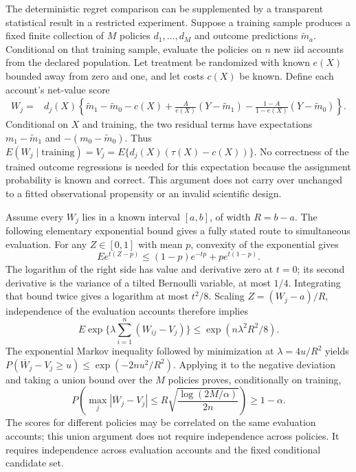 The deterministic regret comparison can be supplemented by a transparent
statistical result in a restricted experiment. Suppose a training sample
produces a fixed finite collection of $M$ policies $d_1,\ldots,d_M$ and
outcome predictions $\widetilde m_a$. Conditional on that training sample,
evaluate the policies on $n$ new iid accounts from the declared population.
Let treatment be randomized with known $e(X)$ bounded away from zero and
one, and let costs $c(X)$ be known. Define each account's net-value score
\begin{align}
 W_j={}&d_j(X)\left\{\widetilde m_1-\widetilde m_0-c(X)
       +\frac{A}{e(X)}(Y-\widetilde m_1)
       -\frac{1-A}{1-e(X)}(Y-\widetilde m_0)\right\}.
 \label{exec17:s4-policy-score}
\end{align}
Conditional on $X$ and training, the two residual terms have expectations
$m_1-\widetilde m_1$ and $-(m_0-\widetilde m_0)$. Thus
$E(W_j\mid\text{training})=V_j=E\{d_j(X)(\tau(X)-c(X))\}$.
No correctness of the trained outcome regressions is needed for this
expectation because the assignment probability is known and correct.
This argument does not carry over unchanged to a fitted observational
propensity or an invalid scientific design.

Assume every $W_j$ lies in a known interval $[a,b]$, of width $R=b-a$.
The following elementary exponential bound gives a fully stated route to
simultaneous evaluation. For any $Z\in[0,1]$ with mean $p$, convexity of
the exponential gives
\[
 E e^{t(Z-p)}\leq (1-p)e^{-tp}+p e^{t(1-p)}.
\]
The logarithm of the right side has value and derivative zero at $t=0$;
its second derivative is the variance of a tilted Bernoulli variable,
at most $1/4$. Integrating that bound twice gives a logarithm at most
$t^2/8$. Scaling $Z=(W_j-a)/R$, independence of the evaluation accounts
therefore implies
\[
 E\exp\{\lambda\textstyle\sum_{i=1}^n(W_{ij}-V_j)\}
       \leq\exp(n\lambda^2R^2/8).
\]
The exponential Markov inequality followed by minimization at
$\lambda=4u/R^2$ yields
$P(\overline W_j-V_j\geq u)\leq\exp(-2nu^2/R^2)$.
Applying it to the negative deviation and taking a union bound over the
$M$ policies proves, conditionally on training,
\begin{equation}
 P\left(\max_j|\overline W_j-V_j|\leq
       R\sqrt{\frac{\log(2M/\alpha)}{2n}}\right)\geq1-\alpha.
 \label{exec17:s4-uniform-bound}
\end{equation}
The scores for different policies may be correlated on the same evaluation
accounts; this union argument does not require independence across policies.
It requires independence across evaluation accounts and the fixed conditional
candidate set.\citep{exec17_s4_extension}

